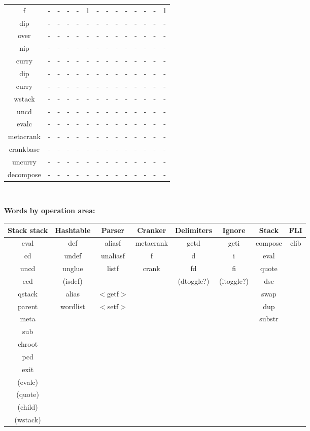 \documentclass[12 pt]{article}%
\begin{document}
\begin{tiny}
\begin{tabular}{|c|c|c|c|c|c|c|c|c|c|c|c|c|c|}
    f & - & - & - & - & 1 & - & - & - & - & - & - & - & 1 \\
    dip & - & - & - & - & - & - & - & - & - & - & - & - & - \\
    over & - & - & - & - & - & - & - & - & - & - & - & - & - \\
    nip & - & - & - & - & - & - & - & - & - & - & - & - & - \\
    curry & - & - & - & - & - & - & - & - & - & - & - & - & - \\
    dip & - & - & - & - & - & - & - & - & - & - & - & - & - \\
    curry & - & - & - & - & - & - & - & - & - & - & - & - & - \\
    wstack & - & - & - & - & - & - & - & - & - & - & - & - & - \\
    uncd & - & - & - & - & - & - & - & - & - & - & - & - & - \\
    evalc & - & - & - & - & - & - & - & - & - & - & - & - & - \\
    metacrank & - & - & - & - & - & - & - & - & - & - & - & - & - \\
    crankbase & - & - & - & - & - & - & - & - & - & - & - & - & - \\
    uncurry & - & - & - & - & - & - & - & - & - & - & - & - & - \\
    decompose & - & - & - & - & - & - & - & - & - & - & - & - & - \\
    \hline
  \end{tabular}\\

\end{tiny}
\bigskip

\newpage\raggedright
\textbf{Words by operation area:}\\
\medskip
\begin{tabular}{|c|c|c|c|c|c|c|c|}
  \hline
  Stack stack & Hashtable & Parser & Cranker & Delimiters & Ignore & Stack & FLI \\
  \hline
  eval & def & aliasf & metacrank & getd & geti & compose & clib \\
  cd & undef & unaliasf & f & d & i & eval & \\
  uncd & unglue & listf & crank & fd & fi & quote & \\
  ccd & (isdef) & & & (dtoggle?) & (itoggle?) & dsc & \\
  qstack & alias & $<$getf$>$ & & & & swap & \\
  parent & wordlist & $<$setf$>$ & & & & dup & \\
  meta & & & & & & substr & \\
  sub & & & & & & & \\
  chroot & & & & & & & \\
  pcd & & & & & & & \\
  exit & & & & & & & \\
  (evalc) & & & & & & & \\
  (quote) & & & & & & & \\
  (child) & & & & & & & \\
  (wstack) & & & & & & & \\
  \hline
\end{tabular}
\bigskip\bigskip
\end{document}
